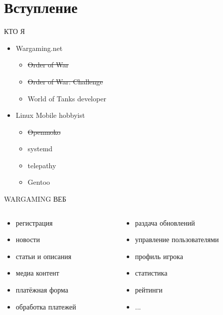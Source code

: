 \documentclass[aspectratio=169]{beamer}
\begin{document}
\section{Вступление}
\begin{frame}{КТО Я}
    \begin{itemize}
        \item Wargaming.net
            \begin{itemize}
                \item \sout{Order of War}
                \item \sout{Order of War: Challenge}
                \item World of Tanks developer
            \end{itemize}
        \item Linux Mobile hobbyist
            \begin{itemize}
                \item \sout{Openmoko}
                \item systemd
                \item telepathy
                \item Gentoo
            \end{itemize}
    \end{itemize}
\end{frame}

\begin{frame}{WARGAMING ВЕБ}
    \begin{columns}
        \begin{column}{0.4\textwidth}
        \begin{itemize}
            \item регистрация
            \item новости
            \item статьи и описания
            \item медиа контент
            \item платёжная форма
            \item обработка платежей
        \end{itemize}
        \end{column}

        \begin{column}{0.4\textwidth}
        \begin{itemize}
            \item раздача обновлений
            \item управление пользователями
            \item профиль игрока
            \item статистика
            \item рейтинги
            \item ...
        \end{itemize}
        \end{column}
    \end{columns}
\end{frame}
\end{document}
